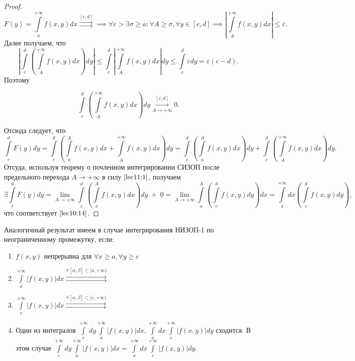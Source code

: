 \documentclass[../../main.tex]{subfiles}
\begin{document}
\begin{proof}
	$$F(y) = \int\limits_a^{+\infty} f(x, y)dx \overset{[c, d]}\rightrightarrows \implies
	\forall \varepsilon > \exists \sigma \geq a: \forall A \geq \sigma, \forall y \in [c, d] \implies \left|\int\limits_A^{+\infty}f(x, y) dx \right| \leq \varepsilon.$$ 
	Далее получаем, что 
	$$ \left| \int\limits_c^d\left(\int\limits_A^{+\infty}f(x, y)dx\right) dy\right| 
	\leq \int\limits_c^d\left|\int\limits_A^{+\infty}f(x, y)dx\right| dy
	\leq \int\limits_c^d \varepsilon dy = \varepsilon(c - d).$$
	Поэтому 
	
	\begin{equation} \label{lec11:1}
		\int\limits_c^d \left( \int\limits_A^{+\infty} f(x, y) dx \right) dy \overset{[c, d]}{\underset{A \rightarrow +\infty}\longrightarrow} 0.
	\end{equation}
	
	Отсюда следует, что
	$$
	\int\limits_c^d F(y)dy = \int\limits_c^d \left( \int\limits_a^A f(x, y)dx + \int\limits_A^{+\infty} f(x, y) dx \right) dy = \int\limits_c^d \left( \int\limits_a^A f(x, y) dx \right) dy + \int\limits_c^d \left( \int\limits_A^{+\infty} f(x, y) dx \right) dy.
	$$
	Отсуда, используя теорему о почленном интегрировании СИЗОП после предельного перехода $A \longrightarrow +\infty$ в силу $\eqref{lec11:1}$, получаем 
	$$
	\exists \int\limits_c^d F(y) dy = \lim_{A \rightarrow +\infty} \int\limits_c^d \left( \int\limits_a^A f(x, y) dx \right) dy \; + \; 0 
	= \lim_{A \rightarrow +\infty} \int\limits_a^A \left( \int\limits_c^d f(x, y) dy \right) dx 
	= \int\limits_a^{+\infty} dx \left( \int\limits_c^d f(x, y) dy \right),
	$$ что соответствует $\eqref{lec10:14}$.
\end{proof}

\begin{rem}
	Аналогичный результат имеем в случае интегрирования НИЗОП-1 по неограниченному промежутку, если:
	\begin{enumerate}
		\item $\displaystyle f(x, y)$ непрерывна для $\forall x \geq a, \forall y \geq c$
		\item $\displaystyle \int\limits_a^{+\infty} \left| f(x, y) \right| dx \overset{\forall [\alpha, \beta] \subset [a, +\infty) }\rightrightarrows$
		\item $\displaystyle \int\limits_c^{+\infty} \left| f(x, y) \right| dx \overset{\forall [\alpha, \beta] \subset [c, +\infty) }\rightrightarrows$
		\item Один из интегралов $\displaystyle \int\limits_c^{+\infty} dy \int\limits_a^{+\infty} \left|f(x, y)\right| dx,
		\int\limits_a^{+\infty} dx \int\limits_c^{+\infty} \left|f(x, y)\right| dy$
		сходится. В этом случае
		$\displaystyle \int\limits_c^{+\infty} dy \int\limits_a^{+\infty} \left|f(x, y)\right| dx = \int\limits_a^{+\infty} dx \int\limits_c^{+\infty} \left|f(x, y)\right| dy$.
	\end{enumerate}
\end{rem}
\end{document}
